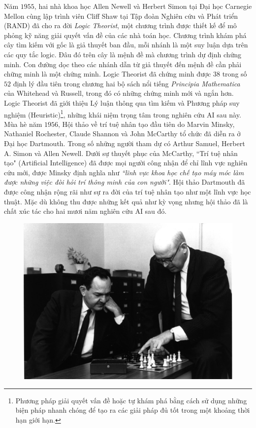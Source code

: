 \begin{multicols}{2}
	Năm $1955$, hai nhà khoa học Allen Newell và Herbert Simon tại Đại học Carnegie Mellon cùng lập trình viên Cliff Shaw tại Tập đoàn Nghiên cứu và Phát triển (RAND) đã cho ra đời \textit{Logic Theorist}, một chương trình được thiết kế để mô phỏng kỹ năng giải quyết vấn đề của các nhà toán học. Chương trình khám phá cây tìm kiếm với gốc là giả thuyết ban đầu, mỗi nhánh là một suy luận dựa trên các quy tắc logic. Đâu đó trên cây là mệnh đề mà chương trình dự định chứng minh. Con đường dọc theo các nhánh dẫn từ giả thuyết đến mệnh đề cần phải chững minh là một chứng minh. Logic Theorist đã chứng minh được $38$ trong số $52$ định lý đầu tiên trong chương hai bộ sách nổi tiếng \textit{Principia Mathematica} của Whitehead và Russell, trong đó có những chứng minh mới và ngắn hơn. Logic Theorist đã giới thiệu Lý luận thông qua tìm kiếm và Phương pháp suy nghiệm (Heuristic)\footnote{\color{cackithi}Phương pháp giải quyết vấn đề hoặc tự khám phá bằng cách sử dụng những biện pháp nhanh chóng để tạo ra các giải pháp đủ tốt trong một khoảng thời hạn giới hạn.}, những khái niệm trọng tâm trong nghiên cứu AI sau này.
	\vskip 0.1cm
	Mùa hè năm $1956$, Hội thảo về trí tuệ nhân tạo đầu tiên do Marvin Minsky, Nathaniel Rochester, Claude Shannon và John McCarthy tổ chức đã diễn ra ở Đại học Dartmouth. Trong số những người tham dự có Arthur Samuel, Herbert A. Simon và Allen Newell. Dưới sự thuyết phục của McCarthy, ``Trí tuệ nhân tạo" (Artificial Intelligence) đã được mọi người công nhận để chỉ lĩnh vực nghiên cứu mới, được Minsky định nghĩa như \textit{``lĩnh vực khoa học chế tạo máy móc làm được những việc đòi hỏi trí thông minh của con người"}. Hội thảo Dartmouth đã được công nhận rộng rãi như sự ra đời của trí tuệ nhân tạo như một lĩnh vực học thuật. Mặc dù không thu được những kết quả như kỳ vọng nhưng hội thảo đã là chất xúc tác cho hai mươi năm nghiên cứu AI sau đó.
	\begin{figure}[H]
		\vspace*{-5pt}
		\centering
		\captionsetup{labelformat= empty, justification=centering}
		\includegraphics[width= 1\linewidth]{Newell_Simon.jpeg}

\end{figure}
\end{multicols}
